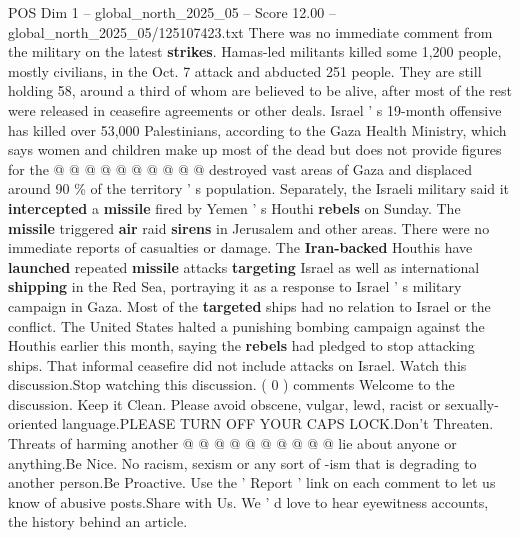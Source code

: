 \begin{textsample}{POS Dim 1 – global\_north\_2025\_05 – Score 12.00 – global\_north\_2025\_05/125107423.txt}
There was no immediate comment from the military on the latest \textbf{strikes}.
Hamas-led militants killed some 1,200 people, mostly civilians, in the Oct. 7 attack and abducted 251 people.
They are still holding 58, around a third of whom are believed to be alive, after most of the rest were released in ceasefire agreements or other deals.
Israel ' s 19-month offensive has killed over 53,000 Palestinians, according to the Gaza Health Ministry, which says women and children make up most of the dead but does not provide figures for the @ @ @ @ @ @ @ @ @ @ destroyed vast areas of Gaza and displaced around 90 \% of the territory ' s population.
Separately, the Israeli military said it \textbf{intercepted} a \textbf{missile} fired by Yemen ' s Houthi \textbf{rebels} on Sunday.
The \textbf{missile} triggered \textbf{air} raid \textbf{sirens} in Jerusalem and other areas.
There were no immediate reports of casualties or damage.
The \textbf{Iran-backed} Houthis have \textbf{launched} repeated \textbf{missile} attacks \textbf{targeting} Israel as well as international \textbf{shipping} in the Red Sea, portraying it as a response to Israel ' s military campaign in Gaza.
Most of the \textbf{targeted} ships had no relation to Israel or the conflict.
The United States halted a punishing bombing campaign against the Houthis earlier this month, saying the \textbf{rebels} had pledged to stop attacking ships.
That informal ceasefire did not include attacks on Israel.
Watch this discussion.Stop watching this discussion. ( 0 ) comments Welcome to the discussion.
Keep it Clean.
Please avoid obscene, vulgar, lewd, racist or sexually-oriented language.PLEASE TURN OFF YOUR CAPS LOCK.Don't Threaten.
Threats of harming another @ @ @ @ @ @ @ @ @ @ lie about anyone or anything.Be Nice.
No racism, sexism or any sort of -ism that is degrading to another person.Be Proactive.
Use the ' Report ' link on each comment to let us know of abusive posts.Share with Us.
We ' d love to hear eyewitness accounts, the history behind an article.

\end{textsample}
